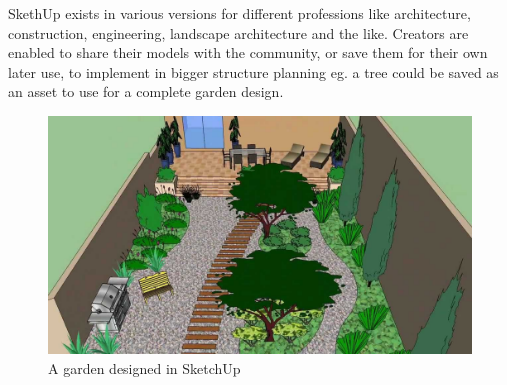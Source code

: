 			SkethUp exists in various versions for different professions like architecture, construction, engineering, landscape architecture and the like. Creators are enabled to share their models with the community, or save them for their own later use, to implement in bigger structure planning eg. a tree could be saved as an asset to use for a complete garden design.
				\begin{figure}[H]
					\centering
					\includegraphics[width=0.6\linewidth]{figure/Analysis/sketchupgarden}
					\caption{A garden designed in SketchUp}
					\label{fig:sketchupgarden}
				\end{figure}